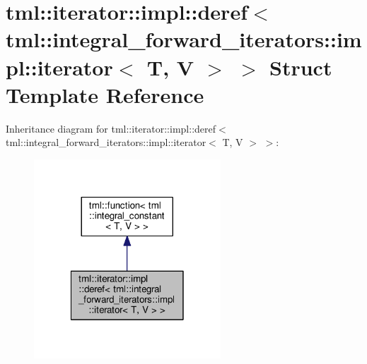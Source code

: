 \hypertarget{structtml_1_1iterator_1_1impl_1_1deref_3_01tml_1_1integral__forward__iterators_1_1impl_1_1iterator_3_01_t_00_01_v_01_4_01_4}{\section{tml\+:\+:iterator\+:\+:impl\+:\+:deref$<$ tml\+:\+:integral\+\_\+forward\+\_\+iterators\+:\+:impl\+:\+:iterator$<$ T, V $>$ $>$ Struct Template Reference}
\label{structtml_1_1iterator_1_1impl_1_1deref_3_01tml_1_1integral__forward__iterators_1_1impl_1_1iterator_3_01_t_00_01_v_01_4_01_4}
}


Inheritance diagram for tml\+:\+:iterator\+:\+:impl\+:\+:deref$<$ tml\+:\+:integral\+\_\+forward\+\_\+iterators\+:\+:impl\+:\+:iterator$<$ T, V $>$ $>$\+:
\nopagebreak
\begin{figure}[H]
\begin{center}
\leavevmode
\includegraphics[width=198pt]{structtml_1_1iterator_1_1impl_1_1deref_3_01tml_1_1integral__forward__iterators_1_1impl_1_1iterat0f2e8a976a308dc710d7477c73da4713}
\end{center}
\end{figure}


